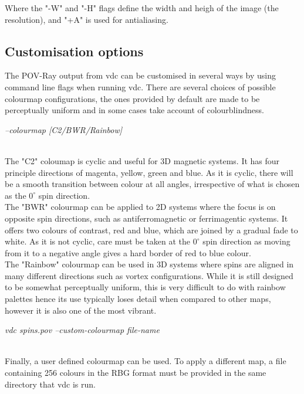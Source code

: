 Where the "-W" and "-H" flags define the width and heigh of the image (the resolution), and "+A" is used for antialiasing. \\ 

\subsection{Customisation options}
The POV-Ray output from vdc can be customised in several ways by using command line flags when running vdc. There are several choices of possible colourmap configurations, the ones provided by default are made to be perceptually uniform and in some cases take account of colourblindness.\\

\begin{minipage}[c]{\textwidth}
\centering
\textit{--colourmap [C2/BWR/Rainbow]}
\end{minipage}\\

The "C2" coloumap is cyclic and useful for 3D magnetic systems. It has four principle directions of magenta, yellow, green and blue. As it is cyclic, there will be a smooth transition between colour at all angles, irrespective of what is chosen as the $0^{\circ}$ spin direction.\\

The "BWR" colourmap can be applied to 2D systems where the focus is on opposite spin directions, such as antiferromagnetic or ferrimagentic systems. It offers two colours of contrast, red and blue, which are joined by a gradual fade to white. As it is not cyclic, care must be taken at the $0^{\circ}$ spin direction as moving from it to a negative angle gives a hard border of red to blue colour. \\

The "Rainbow" colourmap can be used in 3D systems where spins are aligned in many different directions such as vortex configurations. While it is still designed to be somewhat perceptually uniform, this is very difficult to do with rainbow palettes hence its use typically loses detail when compared to other maps, however it is also one of the most vibrant.

\begin{minipage}[c]{\textwidth}
\centering
\textit{vdc spins.pov --custom-colourmap file-name}
\end{minipage}\\

Finally, a user defined colourmap can be used. To apply a different map, a file containing 256 colours in the RBG format must be provided in the same directory that vdc is run.\\


